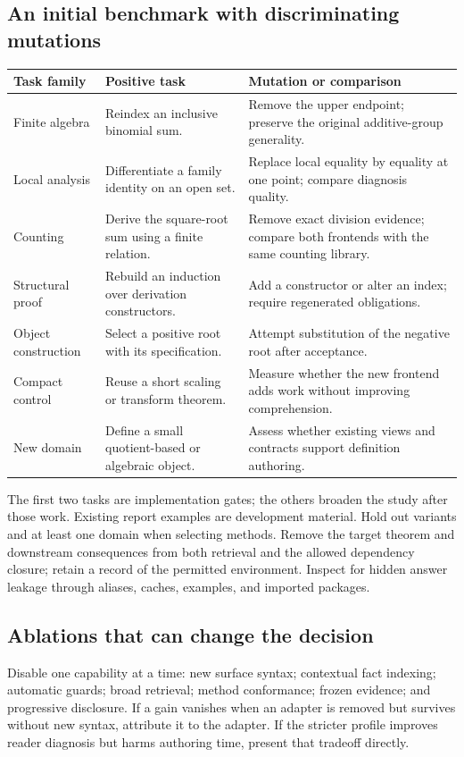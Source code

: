\documentclass[11pt,letterpaper]{article}
\begin{document}
\subsection{An initial benchmark with discriminating mutations}
\begin{longtable}{@{}P{.22\textwidth}P{.34\textwidth}P{.36\textwidth}@{}}
\toprule
Task family & Positive task & Mutation or comparison \\
\midrule
\endhead
Finite algebra & Reindex an inclusive binomial sum. & Remove the upper endpoint;
  preserve the original additive-group generality.\\
Local analysis & Differentiate a family identity on an open set. & Replace local
  equality by equality at one point; compare diagnosis quality.\\
Counting & Derive the square-root sum using a finite relation. & Remove exact
  division evidence; compare both frontends with the same counting library.\\
Structural proof & Rebuild an induction over derivation constructors. & Add a
  constructor or alter an index; require regenerated obligations.\\
Object construction & Select a positive root with its specification. & Attempt
  substitution of the negative root after acceptance.\\
Compact control & Reuse a short scaling or transform theorem. & Measure whether
  the new frontend adds work without improving comprehension.\\
New domain & Define a small quotient-based or algebraic object. & Assess whether
  existing views and contracts support definition authoring.\\
\bottomrule
\end{longtable}

The first two tasks are implementation gates; the others broaden the study after
those work. Existing report examples are development material. Hold out variants
and at least one domain when selecting methods. Remove the target theorem and
downstream consequences from both retrieval and the allowed dependency closure;
retain a record of the permitted environment. Inspect for hidden answer leakage
through aliases, caches, examples, and imported packages.

\subsection{Ablations that can change the decision}
Disable one capability at a time: new surface syntax; contextual fact indexing;
automatic guards; broad retrieval; method conformance; frozen evidence; and
progressive disclosure. If a gain vanishes when an adapter is removed but survives
without new syntax, attribute it to the adapter. If the stricter profile improves
reader diagnosis but harms authoring time, present that tradeoff directly.
\end{document}
